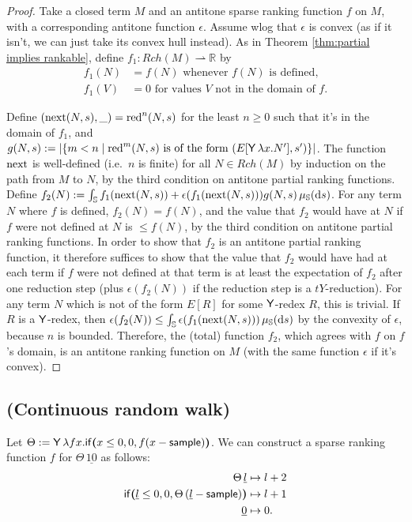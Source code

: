 \AntitonePartial*
\begin{proof}
  Take a closed term $M$ and an antitone sparse ranking function $f$ on $M$, with a corresponding antitone function $\epsilon$. Assume wlog that $\epsilon$ is convex (as if it isn't, we can just take its convex hull instead). As in Theorem \ref{thm:partial implies rankable}, define $f_1 : Rch(M) \rightharpoonup \mathbb R$ by
  \begin{align*}
    f_1(N) &= f(N) \text{ whenever $f(N)$ is defined},\\
    f_1(V) &= 0 \text{ for values $V$ not in the domain of $f$.}
  \end{align*}


  Define $(\operatorname{next}(N,s),\_) = \operatorname{red}^n(N,s)$ for the least $n \geq 0$ such that it's in the domain of $f_1$, and $g(N,s) := \left | \{m < n \mid \operatorname{red}^m(N,s) \text{ is of the form } (E[\mathsf{Y}\, \lambda x. N'],s') \} \right |$. 
  The function $\operatorname{next}$ is well-defined (i.e.~$n$ is finite) for all $N \in Rch(M)$ by induction on the path from $M$ to $N$, by the third condition on antitone partial ranking functions. Define $f_2(N) := \int_{\mathbb{S}} f_1(\operatorname{next}(N,s)) + \epsilon(f_1(\operatorname{next}(N,s))) g(N,s) \, \mu_{{\mathbb{S}}}(\mathrm d s)$. For any term $N$ where $f$ is defined, $f_2(N) = f(N)$, and the value that $f_2$ would have at $N$ if $f$ were not defined at $N$ is $\leq f(N)$, by the third condition on antitone partial ranking functions. In order to show that $f_2$ is an antitone partial ranking function, it therefore suffices to show that the value that $f_2$ would have had at each term if $f$ were not defined at that term is at least the expectation of $f_2$ after one reduction step (plus $\epsilon(f_2(N))$ if the reduction step is a $tY$-reduction). For any term $N$ which is not of the form $E[R]$ for some $\mathsf{Y}$-redex $R$, this is trivial. If $R$ is a $\mathsf{Y}$-redex, then $\epsilon(f_2(N)) \leq \int_{\mathbb{S}} \epsilon(f_1(\operatorname{next}(N,s)))\, \mu_{{\mathbb{S}}}(\mathrm d s)$ by the convexity of $\epsilon$, because $n$ is bounded. Therefore, the (total) function $f_2$, which agrees with $f$ on $f$'s domain, is an antitone ranking function on $M$ (with the same function $\epsilon$ if it's convex).
\end{proof}


\subsection*{ (Continuous random walk)}
Let $\Theta := \mathsf{Y} \, \lambda f x . \mathsf{if}\boldsymbol{(}x \leq 0, 0, f(x - \mathsf{sample})\boldsymbol{)}$. 
We can construct a sparse ranking function $f$ for $\Theta \, \underline{10}$ as follows:
\begin{align*}
\Theta \, \underline l 
&\mapsto 
l + 2
\\
\mathsf{if}\boldsymbol{(}\underline l \leq 0, 0, \Theta \, (\underline l - \mathsf{sample})\boldsymbol{)}
&\mapsto
l + 1
\\
\underline 0 &\mapsto 0.
\end{align*}

